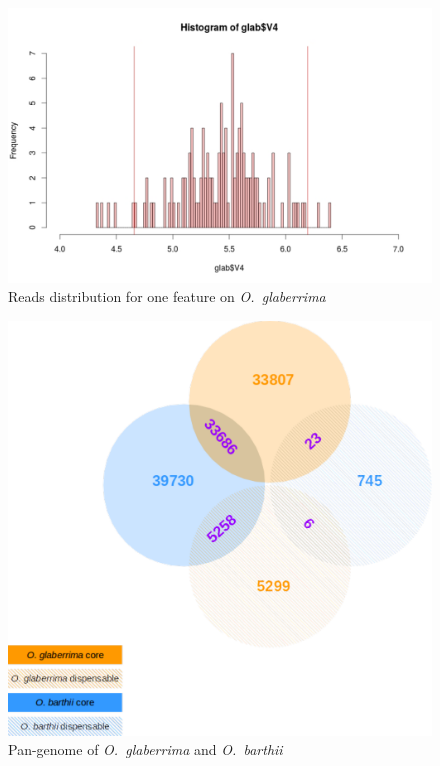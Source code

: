 \documentclass[10pt,letterpaper]{article}
\begin{document}
\begin{figure}
\centering
 \includegraphics[scale=0.7]{readsDistri.pdf}
 \caption{Reads distribution for one feature on \emph{O.~glaberrima}}
 \label{distri}
\end{figure}

\begin{figure}
\centering
\includegraphics[scale=0.7]{panGenomeBothSpecies.pdf}
\caption{Pan-genome of \emph{O.~glaberrima} and \emph{O.~barthii}}
\label{panGSize}
\end{figure}
\end{document}
